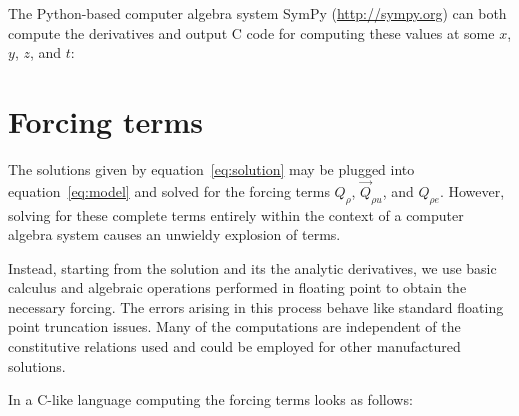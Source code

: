 \documentclass[10pt,reqno]{amsart}
\begin{document}
The Python-based computer algebra system SymPy (\url{http://sympy.org})
can both compute the derivatives and output C code for computing these
values at some $x$, $y$, $z$, and $t$:


\section{Forcing terms}

The solutions given by equation~\eqref{eq:solution} may be plugged into
equation~\eqref{eq:model} and solved for the forcing terms $Q_{\rho}$,
$\vec{Q}_{\rho{}u}$, and $Q_{\rho{}e}$.  However, solving for these complete
terms entirely within the context of a computer algebra system causes an
unwieldy explosion of terms.

Instead, starting from the solution and its the analytic derivatives, we use
basic calculus and algebraic operations performed in floating point to obtain
the necessary forcing.  The errors arising in this process behave like standard
floating point truncation issues.  Many of the computations are independent of
the constitutive relations used and could be employed for other manufactured
solutions.

In a C-like language computing the forcing terms looks as follows:

\end{document}
